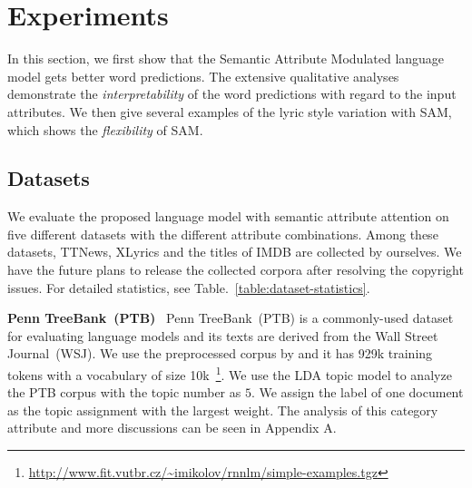\documentclass[a4paper]{article}
\newcommand{\method}{\xspace{SAM}}
\begin{document}
\iffalse
\textbf{External Knowledge for Language Modeling}
Some useful side information is external, such as the knowledge base and some text references~\cite{yang2017reference,ahn2016neural}. Compared with these methods, our model concentrates on the document itself and does not depend on the external knowledge.
\fi

\section{Experiments}
In this section, we first show that the Semantic Attribute Modulated language model gets better word predictions. The extensive qualitative analyses demonstrate the \emph{interpretability} of the word predictions with regard to the input attributes.  We then give several examples of the lyric style variation with \method, which shows the \emph{flexibility} of \method.
\subsection{Datasets}
We evaluate the proposed language model with semantic attribute attention on five different datasets with the different attribute combinations.
Among these datasets, TTNews, XLyrics and the titles of IMDB are collected by ourselves. We have the future plans to release the collected corpora after resolving the copyright issues. For detailed statistics, see Table.~\ref{table:dataset-statistics}.

\textbf{Penn TreeBank~(PTB)}~
Penn TreeBank~(PTB) is a commonly-used dataset for evaluating language models and its texts are derived from the Wall Street Journal~(WSJ). We use the preprocessed corpus by \citeauthor{mikolov2011extensions} and it has 929k training tokens with a vocabulary of size 10k~\footnote{\url{http://www.fit.vutbr.cz/~imikolov/rnnlm/simple-examples.tgz}}. We use the LDA topic model to analyze the PTB corpus with the topic number as $5$. We assign the label of one document as the topic assignment with the largest weight. The analysis of this category attribute and more discussions can be seen in Appendix A.
\end{document}
